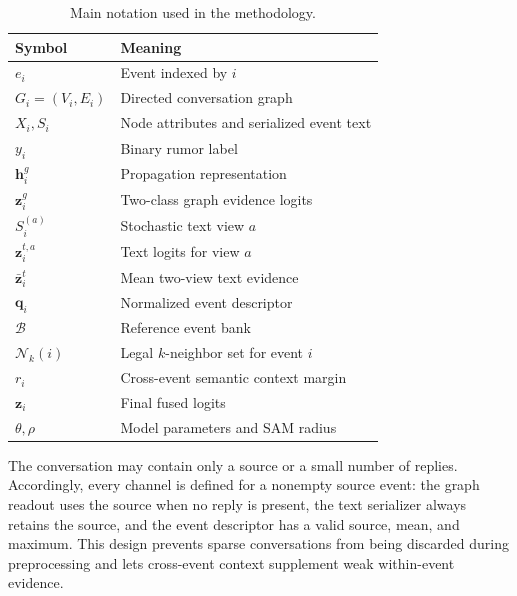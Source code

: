 \documentclass[sigconf,anonymous,review]{../acmart/acmart}
\begin{document}
\begin{table}[H]
  \caption{Main notation used in the methodology.}
  \label{tab:notation}
  \centering
  \small
  \begin{tabular}{@{}p{}p{}@{}}
    \toprule
    Symbol & Meaning \\
    \midrule
    $e_i$ & Event indexed by $i$ \\
    $G_i=(V_i,E_i)$ & Directed conversation graph \\
    $X_i,S_i$ & Node attributes and serialized event text \\
    $y_i$ & Binary rumor label \\
    $\boldsymbol{h}_i^g$ & Propagation representation \\
    $\boldsymbol{z}_i^g$ & Two-class graph evidence logits \\
    $S_i^{(a)}$ & Stochastic text view $a$ \\
    $\boldsymbol{z}_i^{t,a}$ & Text logits for view $a$ \\
    $\bar{\boldsymbol{z}}_i^t$ & Mean two-view text evidence \\
    $\boldsymbol{q}_i$ & Normalized event descriptor \\
    $\mathcal{B}$ & Reference event bank \\
    $\mathcal{N}_k(i)$ & Legal $k$-neighbor set for event $i$ \\
    $r_i$ & Cross-event semantic context margin \\
    $\boldsymbol{z}_i$ & Final fused logits \\
    $\theta,\rho$ & Model parameters and SAM radius \\
    \bottomrule
  \end{tabular}
\end{table}

The conversation may contain only a source or a small number of replies.
Accordingly, every channel is defined for a nonempty source event: the graph
readout uses the source when no reply is present, the text serializer always
retains the source, and the event descriptor has a valid source, mean, and
maximum.  This design prevents sparse conversations from being discarded
during preprocessing and lets cross-event context supplement weak within-event
evidence.
\end{document}
